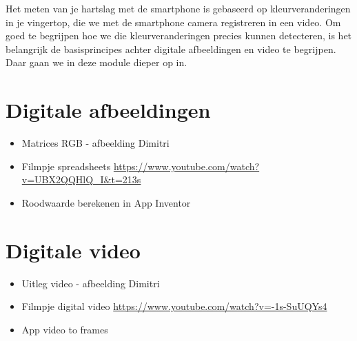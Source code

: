 
\begin{samenvatting}
Het meten van je hartslag met de smartphone is gebaseerd op kleurveranderingen in je vingertop, die we met de smartphone camera registreren in een video. Om goed te begrijpen hoe we die kleurveranderingen precies kunnen detecteren, is het belangrijk de basisprincipes achter digitale afbeeldingen en video te begrijpen. Daar gaan we in deze module dieper op in.
\end{samenvatting}
%

\section{Digitale afbeeldingen}
\label{sec:Mod3_Sec1}
%


\begin{itemize}
	\item Matrices RGB - afbeelding Dimitri
	\item Filmpje spreadsheets \url{https://www.youtube.com/watch?v=UBX2QQHlQ_I&t=213s}
	\item Roodwaarde berekenen in App Inventor
\end{itemize}

\section{Digitale video}
\label{sec:Mod3_Sec2}
%


\begin{itemize}
	\item Uitleg video - afbeelding Dimitri
	\item Filmpje digital video \url{https://www.youtube.com/watch?v=-1s-SuUQYs4}
	\item App video to frames
\end{itemize}


